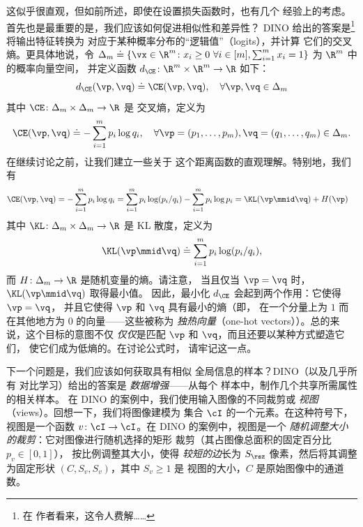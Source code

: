 \documentclass[../../book-main_zh.tex]{subfiles}
\begin{document}
这似乎很直观，但如前所述，即使在设置损失函数时，也有几个
经验上的考虑。首先也是最重要的是，我们应该如何促进相似性和差异性？
DINO \citep{caron2021emerging} 给出的答案是\footnote{在
作者看来，这令人费解……}将输出特征转换为
对应于某种概率分布的“逻辑值”（logits），并计算
它们的交叉熵。更具体地说，令 \(\Delta_{m} \doteq \{\vx
        \in \R^{m} \colon x_{i} \geq 0\ \forall i \in [m], \sum_{i =
1}^{m}x_{i} = 1\}\) 为 \(\R^{m}\) 中的概率向量空间，
并定义函数 \(d_{\CE} \colon \R^{m} \times \R^{m} \to \R\) 如下：
\begin{equation}\label{eq:cross_entropy_difference}
    d_{\CE}(\vp, \vq) \doteq \CE(\vp, \vq), \quad \forall \vp, \vq
    \in \Delta_{m}
\end{equation}
其中 \(\CE \colon \Delta_{m} \times \Delta_{m} \to \R\) 是
交叉熵，定义为
\begin{equation}\label{eq:expts_def_ce}
    \CE(\vp, \vq) \doteq -\sum_{i = 1}^{m}p_{i}\log q_{i}, \quad
    \forall \vp = (p_{1}, \dots, p_{m}), \vq = (q_{1}, \dots, q_{m})
    \in \Delta_{m}.
\end{equation}
在继续讨论之前，让我们建立一些关于
这个距离函数的直观理解。特别地，我们有
\begin{align}
    \CE(\vp, \vq)
    &= -\sum_{i = 1}^{m}p_{i}\log q_{i} = \sum_{i = 1}^{m}p_{i}\log(p_{i}/q_{i})
    - \sum_{i = 1}^{m}p_{i}\log p_{i} = \KL(\vp\mmid \vq) + H(\vp)
\end{align}
其中 \(\KL \colon \Delta_{m} \times \Delta_{m} \to \R\) 是 KL
散度，定义为
\begin{equation}
    \KL(\vp\mmid \vq) \doteq \sum_{i = 1}^{m}p_{i}\log(p_{i}/q_{i}),
\end{equation}
而 \(H \colon \Delta_{m} \to \R\) 是随机变量的熵。请注意，
当且仅当 \(\vp = \vq\) 时，\(\KL(\vp\mmid \vq)\) 取得最小值。
因此，最小化 \(d_{\CE}\) 会起到两个作用：它使得 \(\vp = \vq\)，
并且它使得 \(\vp\) 和 \(\vq\) 具有最小的熵（即，
    在一个分量上为 \(1\) 而在其他地方为 \(0\) 的向量——这些被称为
\textit{独热向量}（one-hot vectors））。总的来说，这个目标的意图不仅
\textit{仅仅}是匹配 \(\vp\) 和 \(\vq\)，而且还要以某种方式塑造它们，
使它们成为低熵的。在讨论公式时，
请牢记这一点。

下一个问题是，我们应该如何获取具有相似
全局信息的样本？DINO（以及几乎所有
对比学习）给出的答案是 \textit{数据增强}——从每个
样本中，制作几个共享所需属性的相关样本。
在 DINO 的案例中，我们使用输入图像的不同裁剪或
\textit{视图}（views）。回想一下，我们将图像建模为
集合 \(\cI\) 的一个元素。在这种符号下，视图是一个函数
\(v \colon \cI \to \cI\)。在 DINO 的案例中，视图是一个
\textit{随机调整大小的裁剪}：它对图像进行随机选择的矩形
裁剪（其占图像总面积的固定百分比 \(p_{v} \in [0, 1]\)），
按比例调整其大小，使得
\textit{较短的边}长为 \(S_{\rsz}\) 像素，然后将其调整
为固定形状 \((C, S_{v}, S_{v})\)，其中 \(S_{v} \geq 1\) 是
视图的大小，\(C\) 是原始图像中的通道数。
\end{document}

